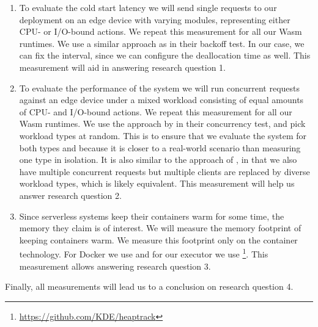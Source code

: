 \begin{enumerate}
    \item To evaluate the cold start latency we will send single requests to our deployment on an edge device with varying modules, representing either CPU- or I/O-bound actions. We repeat this measurement for all our Wasm runtimes. We use a similar approach as \citeauthor{McGrath2017} in their backoff test. In our case, we can fix the interval, since we can configure the deallocation time as well. This measurement will aid in answering research question 1.
    \item To evaluate the performance of the system we will run concurrent requests against an edge device under a mixed workload consisting of equal amounts of CPU- and I/O-bound actions. We repeat this measurement for all our Wasm runtimes. We use the approach by \citeauthor{McGrath2017} in their concurrency test, and pick workload types at random. This is to ensure that we evaluate the system for both types and because it is closer to a real-world scenario than measuring one type in isolation. It is also similar to the approach of \citeauthor{Hall2019}, in that we also have multiple concurrent requests but multiple clients are replaced by diverse workload types, which is likely equivalent. This measurement will help us answer research question 2.
    \item Since serverless systems keep their containers warm for some time, the memory they claim is of interest. We will measure the memory footprint of keeping containers warm.  We measure this footprint only on the container technology. For Docker we use  and for our executor we use  \footnote{\url{https://github.com/KDE/heaptrack}}. This measurement allows answering research question 3.
\end{enumerate}

Finally, all measurements will lead us to a conclusion on research question 4.

